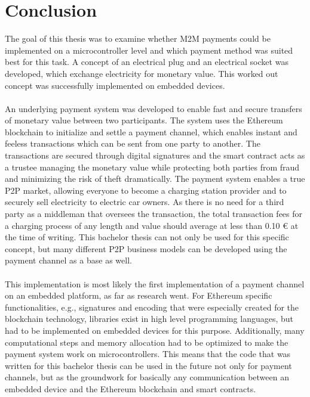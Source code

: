 \section{Conclusion}
The goal of this thesis was to examine whether M2M payments could be implemented on a microcontroller level and which payment method was suited best for this task.
A concept of an electrical plug and an electrical socket was developed, which exchange electricity for monetary value.
This worked out concept was successfully implemented on embedded devices.
\\\\
An underlying payment system was developed to enable fast and secure transfers of monetary value between two participants.
The system uses the Ethereum blockchain to initialize and settle a payment channel, which enables instant and feeless transactions which can be sent from one party to another.
The transactions are secured through digital signatures and the smart contract acts as a trustee managing the monetary value while protecting both parties from fraud and minimizing the risk of theft dramatically.
The payment system enables a true P2P market, allowing everyone to become a charging station provider and to securely sell electricity to electric car owners.
As there is no need for a third party as a middleman that oversees the transaction, the total transaction fees for a charging process of any length and value should average at less than 0.10 \euro{} at the time of writing.
This bachelor thesis can not only be used for this specific concept, but many different P2P business models can be developed using the payment channel as a base as well.
\\\\
This implementation is most likely the first implementation of a payment channel on an embedded platform, as far as research went.
For Ethereum specific functionalities, e.g., signatures and encoding that were especially created for the blockchain technology, libraries exist in high level programming languages, but had to be implemented on embedded devices for this purpose.
Additionally, many computational steps and memory allocation had to be optimized to make the payment system work on microcontrollers.
This means that the code that was written for this bachelor thesis can be used in the future not only for payment channels, but as the groundwork for basically any communication between an embedded device and the Ethereum blockchain and smart contracts.
\\\\
